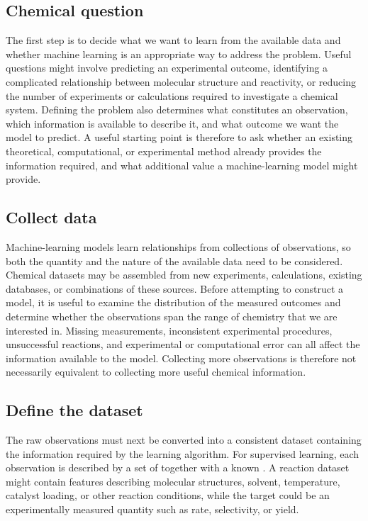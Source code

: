 \subsection{Chemical question}

The first step is to decide what we want to learn from the available data and whether machine learning is an appropriate way to address the problem.
Useful questions might involve predicting an experimental outcome, identifying a complicated relationship between molecular structure and reactivity, or reducing the number of experiments or calculations required to investigate a chemical system.
Defining the problem also determines what constitutes an observation, which information is available to describe it, and what outcome we want the model to predict.
A useful starting point is therefore to ask whether an existing theoretical, computational, or experimental method already provides the information required, and what additional value a machine-learning model might provide.

\subsection{Collect data}

Machine-learning models learn relationships from collections of observations, so both the quantity and the nature of the available data need to be considered.
Chemical datasets may be assembled from new experiments, calculations, existing databases, or combinations of these sources.
Before attempting to construct a model, it is useful to examine the distribution of the measured outcomes and determine whether the observations span the range of chemistry that we are interested in.
Missing measurements, inconsistent experimental procedures, unsuccessful reactions, and experimental or computational error can all affect the information available to the model.
Collecting more observations is therefore not necessarily equivalent to collecting more useful chemical information.

\subsection{Define the dataset}

The raw observations must next be converted into a consistent dataset containing the information required by the learning algorithm.
For supervised learning, each observation is described by a set of  together with a known .
A reaction dataset might contain features describing molecular structures, solvent, temperature, catalyst loading, or other reaction conditions, while the target could be an experimentally measured quantity such as rate, selectivity, or yield.

